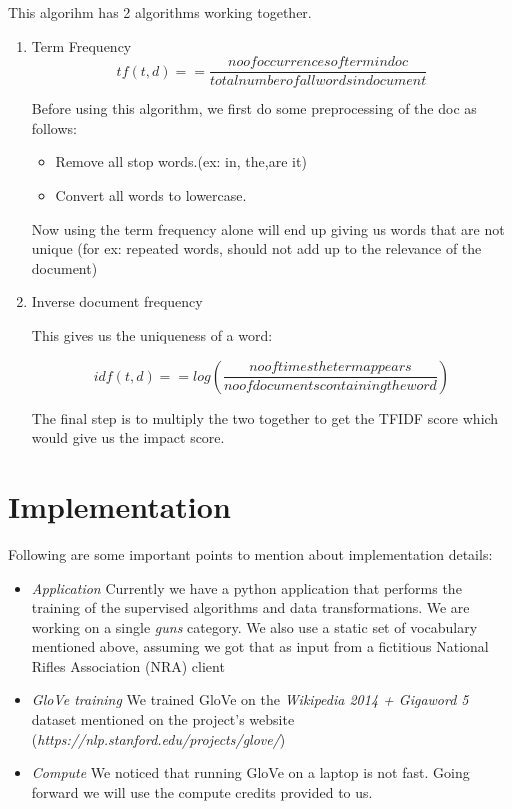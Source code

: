 \documentclass{article}
\begin{document}
This algorihm has 2 algorithms working together.
\begin{enumerate}
\item {Term Frequency}
\[tf(t,d) =  = \frac{no of occurrences of term in doc }{total number of all words in document}\]


Before using this algorithm, we first do some preprocessing of the doc as follows:
\begin{itemize}
\item {Remove all stop words.(ex: in, the,are it)}
\item {Convert all words to lowercase.}
\end {itemize}
Now using the term frequency alone will end up giving us words that are not unique (for ex: repeated words, should not add up to the relevance of the document)

\item Inverse document frequency

 This gives us the uniqueness of a word:

 \[idf(t,d) =  = log(\frac{no of times the term appears }{no of documents containing the word})\]

The final step is to multiply the two together to get the TFIDF score which would give us the impact score.
\end{enumerate}


\maketitle
\section{Implementation} %
Following are some important points to mention about implementation details:
\begin {itemize}
\item \textit{Application} Currently we have a python application that performs the training of the supervised algorithms and data transformations. We are working on a single \textit {guns} category. We also use a static set of vocabulary mentioned above, assuming we got that as input from a fictitious National Rifles Association (NRA) client
\item \textit {GloVe training} We trained GloVe on the \textit{Wikipedia 2014 + Gigaword 5} dataset mentioned on the project's website (\textit{https://nlp.stanford.edu/projects/glove/})
\item \textit {Compute} We noticed that running GloVe on a laptop is not fast. Going forward we will use the compute credits provided to us.
\end {itemize}
\end{document}

